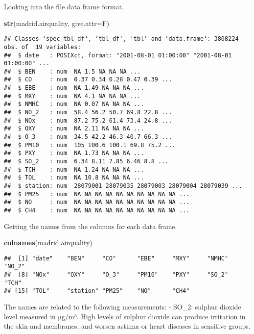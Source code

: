 \documentclass[
]{article}
\newenvironment{Shaded}{\begin{snugshade}}{\end{snugshade}}
\newcommand{\DataTypeTok}[1]{\textcolor[rgb]{0.13,0.29,0.53}{#1}}
\newcommand{\KeywordTok}[1]{\textcolor[rgb]{0.13,0.29,0.53}{\textbf{#1}}}
\newcommand{\NormalTok}[1]{#1}
\begin{document}
Looking into the file data frame format.

\begin{Shaded}
\begin{Highlighting}[]
\KeywordTok{str}\NormalTok{(madrid.airquality, }\DataTypeTok{give.attr=}\NormalTok{F)}
\end{Highlighting}
\end{Shaded}

\begin{verbatim}
## Classes 'spec_tbl_df', 'tbl_df', 'tbl' and 'data.frame': 3808224 obs. of  19 variables:
##  $ date   : POSIXct, format: "2001-08-01 01:00:00" "2001-08-01 01:00:00" ...
##  $ BEN    : num  NA 1.5 NA NA NA ...
##  $ CO     : num  0.37 0.34 0.28 0.47 0.39 ...
##  $ EBE    : num  NA 1.49 NA NA NA ...
##  $ MXY    : num  NA 4.1 NA NA NA ...
##  $ NMHC   : num  NA 0.07 NA NA NA ...
##  $ NO_2   : num  58.4 56.2 50.7 69.8 22.8 ...
##  $ NOx    : num  87.2 75.2 61.4 73.4 24.8 ...
##  $ OXY    : num  NA 2.11 NA NA NA ...
##  $ O_3    : num  34.5 42.2 46.3 40.7 66.3 ...
##  $ PM10   : num  105 100.6 100.1 69.8 75.2 ...
##  $ PXY    : num  NA 1.73 NA NA NA ...
##  $ SO_2   : num  6.34 8.11 7.85 6.46 8.8 ...
##  $ TCH    : num  NA 1.24 NA NA NA ...
##  $ TOL    : num  NA 10.8 NA NA NA ...
##  $ station: num  28079001 28079035 28079003 28079004 28079039 ...
##  $ PM25   : num  NA NA NA NA NA NA NA NA NA NA ...
##  $ NO     : num  NA NA NA NA NA NA NA NA NA NA ...
##  $ CH4    : num  NA NA NA NA NA NA NA NA NA NA ...
\end{verbatim}

Getting the names from the columns for each data frame.

\begin{Shaded}
\begin{Highlighting}[]
\KeywordTok{colnames}\NormalTok{(madrid.airquality) }
\end{Highlighting}
\end{Shaded}

\begin{verbatim}
##  [1] "date"    "BEN"     "CO"      "EBE"     "MXY"     "NMHC"    "NO_2"   
##  [8] "NOx"     "OXY"     "O_3"     "PM10"    "PXY"     "SO_2"    "TCH"    
## [15] "TOL"     "station" "PM25"    "NO"      "CH4"
\end{verbatim}

The names are related to the following measurements: - SO\_2: sulphur
dioxide level measured in μg/m³. High levels of sulphur dioxide can
produce irritation in the skin and membranes, and worsen asthma or heart
diseases in sensitive groups.
\end{document}
